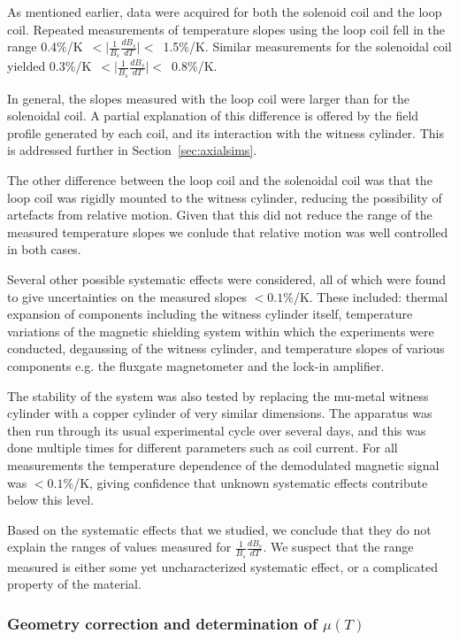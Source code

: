 As mentioned earlier, data were acquired for both the solenoid coil
and the loop coil.  Repeated measurements of temperature slopes using
the loop coil fell in the range
0.4\%/K~$<\vert\frac{1}{B_s}\frac{dB_s}{dT}\vert<$~1.5\%/K.  Similar
measurements for the solenoidal coil yielded
0.3\%/K~$<\vert\frac{1}{B_s}\frac{dB_s}{dT}\vert<$~0.8\%/K.

In general, the slopes measured with the loop coil were larger than for
the solenoidal coil.  A partial explanation of this difference is
offered by the field profile generated by each coil, and its
interaction with the witness cylinder.  This is addressed further in
Section~\ref{sec:axialsims}.

The other difference between the loop coil and the solenoidal coil was
that the loop coil was rigidly mounted to the witness cylinder,
reducing the possibility of artefacts from relative motion.  Given
that this did not reduce the range of the measured temperature slopes
we conlude that relative motion was well controlled in both cases.

Several other possible systematic effects were considered, all of
which were found to give uncertainties on the measured slopes
$<0.1\%$/K.  These included: thermal expansion of components including
the witness cylinder itself, temperature variations of the magnetic
shielding system within which the experiments were conducted,
degaussing of the witness cylinder, and temperature slopes of various
components e.g. the fluxgate magnetometer and the lock-in amplifier.

The stability of the system was also tested by replacing the mu-metal
witness cylinder with a copper cylinder of very similar dimensions.
The apparatus was then run through its usual experimental cycle over
several days, and this was done multiple times for different
parameters such as coil current.  For all measurements the temperature
dependence of the demodulated magnetic signal was $<0.1$\%/K, giving
confidence that unknown systematic effects contribute below this
level.

Based on the systematic effects that we studied, we conclude that they
do not explain the ranges of values measured for
$\frac{1}{B_s}\frac{dB_s}{dT}$.  We suspect that the range measured is
either some yet uncharacterized systematic effect, or a complicated
property of the material.


\subsubsection{Geometry correction and determination of $\mu(T)$\label{sec:axialsims}}

